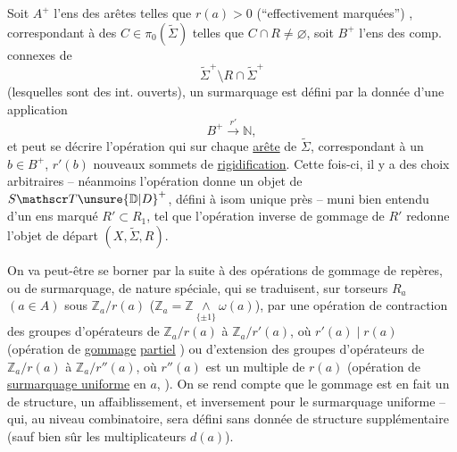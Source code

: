 Soit $A^+$ l'ens des arêtes   telles que $r(a)>0$ (``effectivement marquées'') , correspondant à des $C\in\pi_0(\widetilde\Sigma)$ telles que $C\cap R\ne\varnothing$, soit $B^+$ l'ens des comp. connexes de
\[
\widetilde\Sigma^+\setminus R\cap\widetilde\Sigma^+
\]
(lesquelles sont des int. ouverts), un surmarquage est défini par la donnée d'une application
\[
B^+\xrightarrow{r'}\mathbb N,
\]
et peut se décrire  l'opération qui  sur chaque \uline{arête} de $\widetilde\Sigma$, correspondant à un $b\in B^+$, $r'(b)$ nouveaux sommets de \uline{rigidification}. Cette fois-ci,  il y a des choix arbitraires -- néanmoins l'opération donne un objet de $S\mathscr T\unsure{\mathbb D|D}^+$, défini à isom unique près --  muni bien entendu d'un ens marqué $R'\subset R_1$, tel que l'opération inverse de gommage de $R'$ redonne l'objet de départ $(X,\widetilde\Sigma,R)$.

On va peut-être se borner par la suite à des opérations de gommage de repères, ou de surmarquage, de nature spéciale, qui se traduisent, sur  torseurs $R_a$ $(a\in A)$  sous $\mathbb Z_a/r(a)$  ($\mathbb Z_a=\mathbb Z\mathbin{\underset{\{\pm1\}}{\wedge}}\omega(a)$), par une opération de contraction des groupes d'opérateurs de $\mathbb Z_a/r(a)$ à $\mathbb Z_a/r'(a)$, où $r'(a)\mid r(a)$ (opération de \uline{gommage} \uline{partiel}  ) ou d'extension des groupes d'opérateurs de $\mathbb Z_a/r(a)$ à $\mathbb Z_a/r''(a)$, où $r''(a)$  est un multiple de $r(a)$ (opération de \uline{surmarquage uniforme} en $a$, ). On se rend compte  que le gommage  est en fait un  de structure,  un affaiblissement, et inversement pour le surmarquage uniforme -- qui, au niveau combinatoire, sera défini sans donnée de structure supplémentaire (sauf bien sûr les multiplicateurs $d(a)$).

